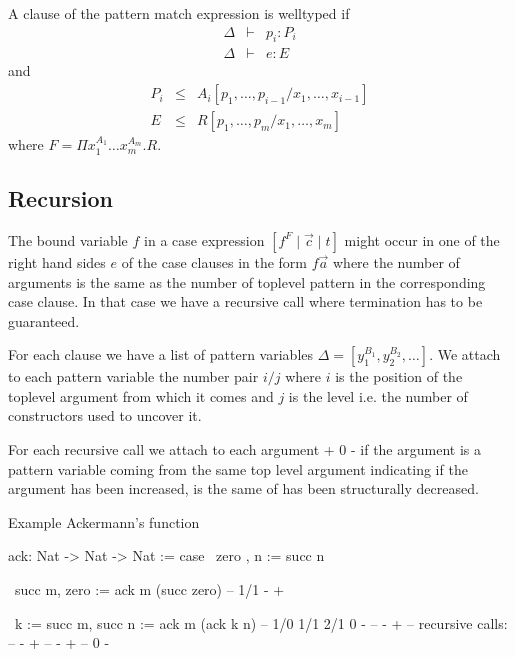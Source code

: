 A clause of the pattern match expression is welltyped if
$$
\begin{array}{lll}
    \Delta &\vdash& p_i : P_i
    \\
    \Delta &\vdash& e : E
\end{array}
$$
%
and
%
$$
\begin{array}{lll}
    P_i &\le& A_i[p_1,\ldots,p_{i-1} / x_1,\ldots,x_{i-1}]
    \\
    E   &\le& R[p_1,\ldots,p_m / x_1,\ldots,x_m]
\end{array}
$$
%
where $F = \Pi x_1^{A_1} \ldots x_m^{A_m}. R$.






\subsection{Recursion}

The bound variable $f$ in a case expression $[f^F \mid \vec c \mid t]$ might
occur in one of the right hand sides $e$ of the case clauses in the form $f \vec
a$ where the number of arguments is the same as the number of toplevel pattern
in the corresponding case clause. In that case we have a recursive call where
termination has to be guaranteed.

For each clause we have a list of pattern variables $\Delta = [y_1^{B_1},
y_2^{B_2}, \ldots ]$. We attach to each pattern variable the number pair $i/j$
where $i$ is the position of the toplevel argument from which it comes and
$j$ is the level i.e. the number of constructors used to uncover it.

For each recursive call we attach to each argument + 0 - if the argument is a
pattern variable coming from the same top level argument indicating if the
argument has been increased, is the same of has been structurally decreased.

\noindent Example Ackermann's function
\begin{alba}
    ack: Nat -> Nat -> Nat := case
        \ zero  ,      n      :=  succ n

        \ succ m,      zero   :=  ack m (succ zero)
    --         1/1                    -  +

        \ k := succ m, succ n :=  ack m (ack k n)
    --    1/0       1/1     2/1              0 -
    --                                -  +
    --  recursive calls:
    --     - +
    --     - +
    --     0 -
\end{alba}


